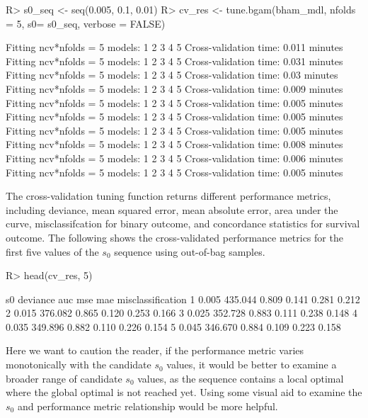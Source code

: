 \documentclass[
]{jss}
\begin{document}
\begin{CodeChunk}
\begin{CodeInput}
R> s0_seq <- seq(0.005, 0.1, 0.01)
R> cv_res <- tune.bgam(bham_mdl, nfolds = 5, s0= s0_seq, verbose = FALSE)
\end{CodeInput}
\begin{CodeOutput}
Fitting ncv*nfolds = 5 models: 
1 2 3 4 5 
 Cross-validation time: 0.011 minutes 
Fitting ncv*nfolds = 5 models: 
1 2 3 4 5 
 Cross-validation time: 0.031 minutes 
Fitting ncv*nfolds = 5 models: 
1 2 3 4 5 
 Cross-validation time: 0.03 minutes 
Fitting ncv*nfolds = 5 models: 
1 2 3 4 5 
 Cross-validation time: 0.009 minutes 
Fitting ncv*nfolds = 5 models: 
1 2 3 4 5 
 Cross-validation time: 0.005 minutes 
Fitting ncv*nfolds = 5 models: 
1 2 3 4 5 
 Cross-validation time: 0.005 minutes 
Fitting ncv*nfolds = 5 models: 
1 2 3 4 5 
 Cross-validation time: 0.005 minutes 
Fitting ncv*nfolds = 5 models: 
1 2 3 4 5 
 Cross-validation time: 0.008 minutes 
Fitting ncv*nfolds = 5 models: 
1 2 3 4 5 
 Cross-validation time: 0.006 minutes 
Fitting ncv*nfolds = 5 models: 
1 2 3 4 5 
 Cross-validation time: 0.005 minutes 
\end{CodeOutput}
\end{CodeChunk}

The cross-validation tuning function returns different performance
metrics, including deviance, mean squared error, mean absolute error,
area under the curve, misclassifcation for binary outcome, and
concordance statistics for survival outcome. The following shows the
cross-validated performance metrics for the first five values of the
\(s_0\) sequence using out-of-bag samples.

\begin{CodeChunk}
\begin{CodeInput}
R> head(cv_res, 5)
\end{CodeInput}
\begin{CodeOutput}
     s0 deviance   auc   mse   mae misclassification
1 0.005  435.044 0.809 0.141 0.281             0.212
2 0.015  376.082 0.865 0.120 0.253             0.166
3 0.025  352.728 0.883 0.111 0.238             0.148
4 0.035  349.896 0.882 0.110 0.226             0.154
5 0.045  346.670 0.884 0.109 0.223             0.158
\end{CodeOutput}
\end{CodeChunk}

Here we want to caution the reader, if the performance metric varies
monotonically with the candidate \(s_0\) values, it would be better to
examine a broader range of candidate \(s_0\) values, as the sequence
contains a local optimal where the global optimal is not reached yet.
Using some visual aid to examine the \(s_0\) and performance metric
relationship would be more helpful.
\end{document}

